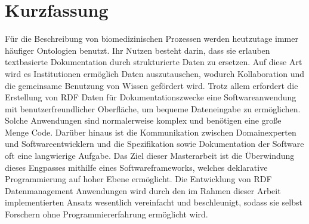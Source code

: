\chapter*{Kurzfassung}

Für die Beschreibung von biomedizinischen Prozessen werden heutzutage immer häufiger Ontologien benutzt. Ihr Nutzen besteht darin, dass sie erlauben textbasierte Dokumentation durch strukturierte Daten zu ersetzen. Auf diese Art wird es Institutionen ermöglich Daten auszutauschen, wodurch Kollaboration und die gemeinsame Benutzung von Wissen gefördert wird. Trotz allem erfordert die Erstellung von RDF Daten für Dokumentationszwecke eine Softwareanwendung mit benutzerfreundlicher Oberfläche, um bequeme Dateneingabe zu ermöglichen. Solche Anwendungen sind normalerweise komplex und benötigen eine große Menge Code. Darüber hinaus ist die Kommunikation zwischen Domainexperten und Softwareentwicklern und die Spezifikation sowie Dokumentation der Software oft eine langwierige Aufgabe. Das Ziel dieser Masterarbeit ist die Überwindung dieses Engpasses mithilfe eines Softwareframeworks, welches deklarative Programmierung auf hoher Ebene ermöglicht. Die Entwicklung von RDF Datenmanagement Anwendungen wird durch den im Rahmen dieser Arbeit implementierten Ansatz wesentlich vereinfacht und beschleunigt, sodass sie selbst Forschern ohne Programmiererfahrung ermöglicht wird.

\linespread{1.25}\selectfont

\tableofcontents %
\listoffigures  %
\blankpage
\blankpage






%

\blankpage


\pagestyle{empty}
\newpage
